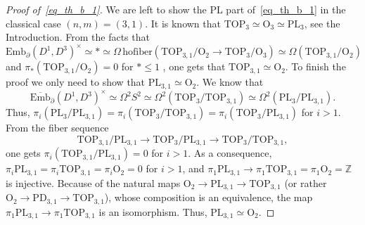 \documentclass[11pt]{amsart}
\theoremstyle{definition}
\newcommand{\Z}{{\mathbb Z}}
\newcommand{\Ebar}{\overline{\mathrm{Emb}}}
\newcommand{\Emb}{\mathrm{Emb}}
\newcommand{\PL}{\mathrm{PL}}
\newcommand{\TOP}{\mathrm{TOP}}
\newcommand{\OO}{\mathrm{O}}
\newcommand{\PD}{\mathrm{PD}}
\newcommand{\hofiber}{\mathrm{hofiber}}
\numberwithin{equation}{section}
\begin{document}
\begin{proof}[Proof of~\eqref{eq_th_b_1}]
We are left to show the PL part of~\eqref{eq_th_b_1} in the classical case $(n,m)=(3,1)$. It is known that $\TOP_3\simeq
\OO_3\simeq\PL_3$, see the Introduction. From the facts that
\[
\Emb_\partial(D^1,D^3)^\times\simeq *\simeq \Omega\,\hofiber\left(\TOP_{3,1}/\OO_2\to \TOP_3/\OO_3\right)
\simeq\Omega(\TOP_{3,1}/\OO_2)
\]
and $\pi_*(\TOP_{3,1}/\OO_2)=0$ for $*\leq 1$ \cite{KS_codim2}, one gets that $\TOP_{3,1}\simeq\OO_2$. 
To finish the proof we only need to show that $\PL_{3,1}\simeq\OO_2$. 
We know that
\[
\Ebar_\partial(D^1,D^3)^\times\simeq\Omega^2S^2\simeq\Omega^2(\TOP_3/\TOP_{3,1})\simeq\Omega^2(\PL_3/\PL_{3,1}).
\]
Thus, $\pi_i(\PL_3/\PL_{3,1})=\pi_i(\TOP_3/\TOP_{3,1})=\pi_i(\TOP_3/\PL_{3,1})$ for $i>1$. From the fiber sequence
\[
\TOP_{3,1}/\PL_{3,1}\to \TOP_3/\PL_{3,1} \to \TOP_3/\TOP_{3,1},
\]
one gets $\pi_i(\TOP_{3,1}/\PL_{3,1})=0$ for $i>1$. As a consequence, $\pi_i\PL_{3,1}=\pi_i\TOP_{3,1}=
\pi_i\OO_2=0$ for $i>1$, and $\pi_1\PL_{3,1}\to\pi_1\TOP_{3,1}=\pi_1\OO_2=\Z$ is injective. 
Because of the natural maps $\OO_2\to\PL_{3,1}\to\TOP_{3,1}$ (or rather $\OO_2\to\PD_{3,1}\to\TOP_{3,1}$),
whose composition is an equivalence,
the map $\pi_1\PL_{3,1}\to\pi_1\TOP_{3,1}$ is an isomorphism. Thus, $\PL_{3,1}\simeq\OO_2$.
\end{proof}
\end{document}
